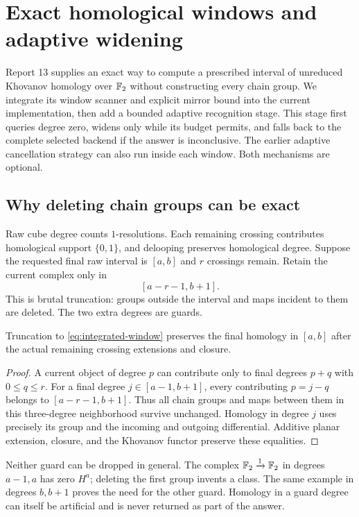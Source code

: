 \section{Exact homological windows and adaptive widening}
\label{sec:window-integration}

Report 13 supplies an exact way to compute a prescribed interval of
unreduced Khovanov homology over $\mathbb{F}_2$ without constructing every chain
group. We integrate its window scanner and explicit mirror bound into the
current implementation, then add a bounded adaptive recognition stage.
This stage first queries degree zero, widens only while its budget permits,
and falls back to the complete selected backend if the answer is
inconclusive. The earlier adaptive cancellation strategy can also run
inside each window. Both mechanisms are optional.

\subsection{Why deleting chain groups can be exact}
Raw cube degree counts $1$-resolutions. Each remaining crossing contributes
homological support $\{0,1\}$, and delooping preserves homological degree.
Suppose the requested final raw interval is $[a,b]$ and $r$ crossings
remain. Retain the current complex only in
\begin{equation}\label{eq:integrated-window}
 [a-r-1,b+1].
\end{equation}
This is brutal truncation: groups outside the interval and maps incident
to them are deleted. The two extra degrees are guards.

\begin{lemma}
Truncation to \eqref{eq:integrated-window} preserves the final homology
in $[a,b]$ after the actual remaining crossing extensions and closure.
\end{lemma}
\begin{proof}
A current object of degree $p$ can contribute only to final degrees
$p+q$ with $0\leq q\leq r$. For a final degree
$j\in[a-1,b+1]$, every contributing $p=j-q$ belongs to
$[a-r-1,b+1]$. Thus all chain groups and maps between them in this
three-degree neighborhood survive unchanged. Homology in degree $j$
uses precisely its group and the incoming and outgoing differential.
Additive planar extension, closure, and the Khovanov functor preserve
these equalities.
\end{proof}

Neither guard can be dropped in general. The complex
$\mathbb{F}_2\xrightarrow{1}\mathbb{F}_2$ in degrees $a-1,a$ has zero $H^a$;
deleting the first group invents a class. The same example in degrees
$b,b+1$ proves the need for the other guard. Homology in a guard degree
can itself be artificial and is never returned as part of the answer.


